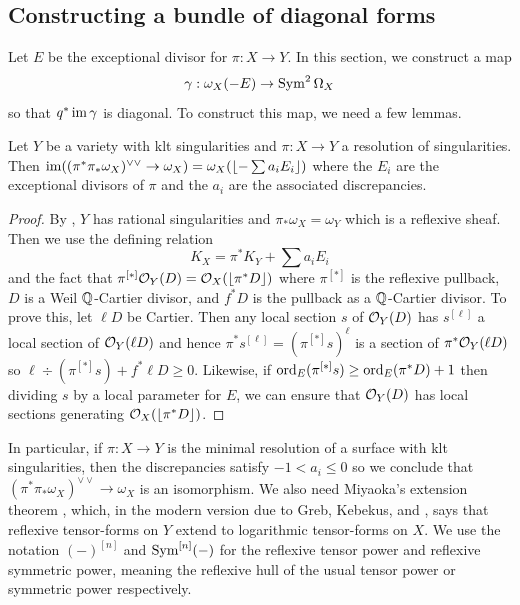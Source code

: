 \documentclass[main.tex]{subfiles}
\begin{document}
\subsection{Constructing a bundle of diagonal forms} \label{sec:diagonal_forms}

Let $E$ be the exceptional divisor for $\pi : X \to Y$. In this section, we construct a map 
\[ \gamma : \omega_X(-E) \to \operatorname{\mathrm{Sym}}^2 \Omega_X \]
so that $q^* \operatorname{\mathrm{im}}{\gamma}$ is diagonal. To construct this map, we need a few lemmas.

\begin{lemma} \label{lem:klt_push_pull_canonical}
Let $Y$ be a variety with klt singularities and $\pi : X \to Y$ a resolution of singularities. Then $\operatorname{\mathrm{im}}( (\pi^* \pi_* \omega_X)^{\vee \vee} \to \omega_X) = \omega_X(\lfloor- \sum a_i E_i\rfloor)$ where the $E_i$ are the exceptional divisors of $\pi$ and the $a_i$ are the associated discrepancies.
\end{lemma}

\begin{proof}
By \cite[Theorem 3 + Theorem 4]{kovacs:rational_singularities}, $Y$ has rational singularities and $\pi_* \omega_X = \omega_Y$ which is a reflexive sheaf. Then we use the defining relation
\[ K_X = \pi^* K_Y + \sum a_i E_i \]
and the fact that  $\pi^{[*]} \mathcal{O}_{Y}(D) = \mathcal{O}_{X}(\lfloor\pi^* D\rfloor)$ where $\pi^{[*]}$ is the reflexive pullback, $D$ is a Weil $\mathbb{Q}$-Cartier divisor, and $f^* D$ is the pullback as a $\mathbb{Q}$-Cartier divisor. To prove this, let $\ell D$ be Cartier. Then any local section $s$ of $\mathcal{O}_{Y}(D)$ has $s^{[\ell]}$ a local section of $\mathcal{O}_{Y}(\ell D)$ and hence $\pi^* s^{[\ell]} = (\pi^{[*]} s)^\ell$ is a section of $\pi^* \mathcal{O}_{Y}(\ell D)$ so $\ell \div(\pi^{[*]} s) + f^* \ell D \ge 0$. Likewise, if $\operatorname{\mathrm{ord}}_E(\pi^{[*]} s) \ge \operatorname{\mathrm{ord}}_E(\pi^* D) + 1$ then dividing $s$ by a local parameter for $E$, we can ensure that $\mathcal{O}_{Y}(D)$ has local sections generating $\mathcal{O}_{X}(\lfloor\pi^* D\rfloor)$.
\end{proof}

In particular, if $\pi : X \to Y$ is the minimal resolution of a surface with klt singularities, then the discrepancies satisfy $-1 < a_i \le 0$ so we conclude that $(\pi^* \pi_* \omega_X)^{\vee \vee} \to \omega_X$ is an isomorphism. We also need Miyaoka's extension theorem \cite{miyaoka:extension_theorem}, which, in the modern version due to Greb, Kebekus, and \Kovacs, says that reflexive tensor-forms on $Y$ extend to logarithmic tensor-forms on $X$. We use the notation $(-)^{[n]}$ and $\operatorname{\mathrm{Sym}}^{[n]}(-)$ for the reflexive tensor power and reflexive symmetric power, meaning the reflexive hull of the usual tensor power or symmetric power respectively.
\end{document}
